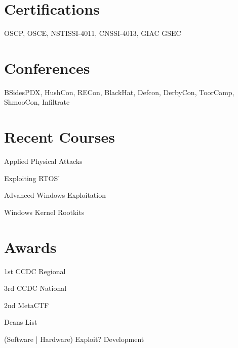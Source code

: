 \documentclass[]{hieudo-build}
\begin{document}
\begin{minipage}[t]{0.34\textwidth}
		\section{Certifications}
		OSCP, OSCE, NSTISSI-4011, CNSSI-4013, GIAC GSEC
		\section{Conferences} 
		BSidesPDX, HushCon, RECon, BlackHat, Defcon, DerbyCon, ToorCamp, ShmooCon, Infiltrate
		\section{Recent Courses}
		\begin{tightemize}
		\item Applied Physical Attacks
		\item Exploiting RTOS'
		\item Advanced Windows Exploitation
		\item Windows Kernel Rootkits
		\end{tightemize}
		
		\section{Awards} 
		\begin{tightemize}
		\item 1st CCDC Regional
		\item 3rd CCDC National
		\item 2nd MetaCTF
		\item Deans List
		\end{tightemize}
		\sectionsep
		(Software | Hardware) Exploit? Development\hspace{28em}
		
	\end{minipage} 
\end{document}
